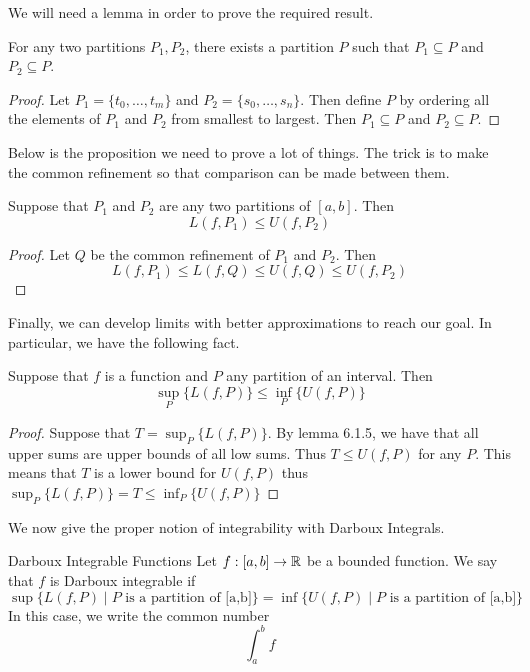 \documentclass[a4paper]{article}
\begin{document}
We will need a lemma in order to prove the required result. 

\begin{lmm}{}{} For any two partitions $P_1,P_2$, there exists a partition $P$ such that $P_1\subseteq P$ and $P_2\subseteq P$. \tcbline
\begin{proof} Let $P_1=\{t_0,\dots,t_m\}$ and $P_2=\{s_0,\dots,s_n\}$. Then define $P$ by ordering all the elements of $P_1$ and $P_2$ from smallest to largest. Then $P_1\subseteq P$ and $P_2\subseteq P$. 
\end{proof}
\end{lmm}

Below is the proposition we need to prove a lot of things. The trick is to make the common refinement so that comparison can be made between them. 

\begin{prp}{}{} Suppose that $P_1$ and $P_2$ are any two partitions of $[a,b]$. Then $$L(f,P_1)\leq U(f,P_2)$$ \tcbline
\begin{proof} Let $Q$ be the common refinement of $P_1$ and $P_2$. Then $$L(f,P_1)\leq L(f,Q)\leq U(f,Q)\leq U(f,P_2)$$
\end{proof}
\end{prp}

Finally, we can develop limits with better approximations to reach our goal. In particular, we have the following fact. 

\begin{lmm}{}{} Suppose that $f$ is a function and $P$ any partition of an interval. Then $$\sup_P\{L(f,P)\}\leq\inf_P\{U(f,P)\}$$ \tcbline
\begin{proof} Suppose that $T=\sup_P\{L(f,P)\}$. By lemma 6.1.5, we have that all upper sums are upper bounds of all low sums. Thus $T\leq U(f,P)$ for any $P$. This means that $T$ is a lower bound for $U(f,P)$ thus $\sup_P\{L(f,P)\}=T\leq\inf_P\{U(f,P)\}$
\end{proof}
\end{lmm}

We now give the proper notion of integrability with Darboux Integrals. 

\begin{defn}{Darboux Integrable Functions}{} Let $f:[a,b]\to\mathbb{R}$ be a bounded function. We say that $f$ is Darboux integrable if $$\sup\{L(f,P)\;|\;P\text{ is a partition of [a,b]}\}=\inf\{U(f,P)\;|\;P\text{ is a partition of [a,b]}\}$$ In this case, we write the common number $$\int_{a}^{b}f$$
\end{defn}
\end{document}
